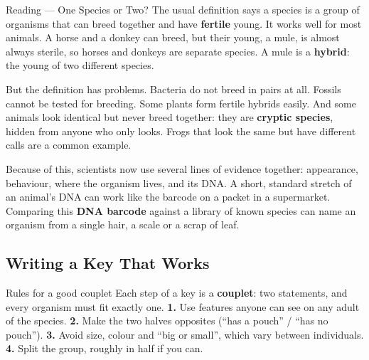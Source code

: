 \label{read:3}

\begin{readingbox}{Reading --- One Species or Two?}
The usual definition says a species is a group of organisms that can breed together and have \textbf{fertile} young. It works well for most animals. A horse and a donkey can breed, but their young, a mule, is almost always sterile, so horses and donkeys are separate species. A mule is a \textbf{hybrid}: the young of two different species.

But the definition has problems. Bacteria do not breed in pairs at all. Fossils cannot be tested for breeding. Some plants form fertile hybrids easily. And some animals look identical but never breed together: they are \textbf{cryptic species}, hidden from anyone who only looks. Frogs that look the same but have different calls are a common example.

Because of this, scientists now use several lines of evidence together: appearance, behaviour, where the organism lives, and its DNA. A short, standard stretch of an animal's DNA can work like the barcode on a packet in a supermarket. Comparing this \textbf{DNA barcode} against a library of known species can name an organism from a single hair, a scale or a scrap of leaf.
\end{readingbox}

\rcreset
{}

\label{theory:3}

\subsection{Writing a Key That Works}\label{sub:a3.1}

\begin{skillbox}{Rules for a good couplet}
Each step of a key is a \textbf{couplet}: two statements, and every organism must fit exactly one.
\textbf{1.} Use features anyone can see on any adult of the species. \textbf{2.} Make the two halves opposites (``has a pouch'' / ``has no pouch''). \textbf{3.} Avoid size, colour and ``big or small'', which vary between individuals. \textbf{4.} Split the group, roughly in half if you can.
\end{skillbox}

